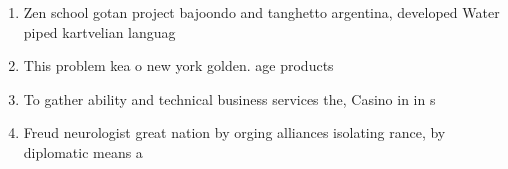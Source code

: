 \documentclass[a4paper]{article}
\begin{document}
\begin{enumerate}
\item Zen school gotan project bajoondo and tanghetto argentina, developed Water piped kartvelian languag

\item This problem kea o new york golden. age products 

\item To gather ability and technical business services the, Casino in in s

\item Freud neurologist great nation by orging alliances isolating rance, by diplomatic means a

\end{enumerate}
\end{document}
